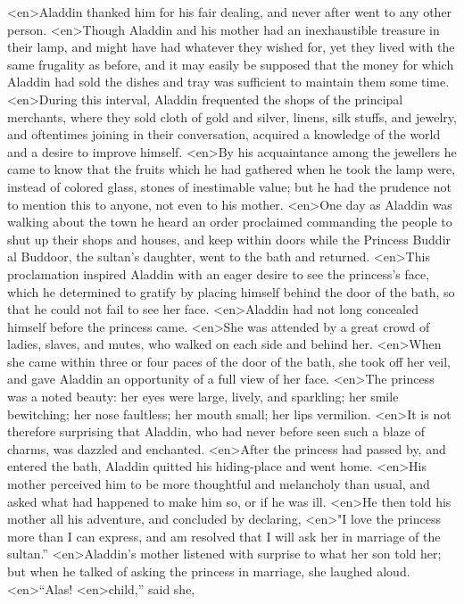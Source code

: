 <en>Aladdin thanked him for his fair dealing, and never after went to any other person.
<en>Though Aladdin and his mother had an inexhaustible treasure in their lamp, and might have had whatever they wished for, yet they lived with the same frugality as before, and it may easily be supposed that the money for which Aladdin had sold the dishes and tray was sufficient to maintain them some time.
<en>During this interval, Aladdin frequented the shops of the principal merchants, where they sold cloth of gold and silver, linens, silk stuffs, and jewelry, and oftentimes joining in their conversation, acquired a knowledge of the world and a desire to improve himself.
<en>By his acquaintance among the jewellers he came to know that the fruits which he had gathered when he took the lamp were, instead of colored glass, stones of inestimable value; but he had the prudence not to mention this to anyone, not even to his mother.
<en>One day as Aladdin was walking about the town he heard an order proclaimed commanding the people to shut up their shops and houses, and keep within doors while the Princess Buddir al Buddoor, the sultan’s daughter, went to the bath and returned.
<en>This proclamation inspired Aladdin with an eager desire to see the princess’s face, which he determined to gratify by placing himself behind the door of the bath, so that he could not fail to see her face.
<en>Aladdin had not long concealed himself before the princess came.
<en>She was attended by a great crowd of ladies, slaves, and mutes, who walked on each side and behind her.
<en>When she came within three or four paces of the door of the bath, she took off her veil, and gave Aladdin an opportunity of a full view of her face.
<en>The princess was a noted beauty: her eyes were large, lively, and sparkling; her smile bewitching; her nose faultless; her mouth small; her lips vermilion.
<en>It is not therefore surprising that Aladdin, who had never before seen such a blaze of charms, was dazzled and enchanted.
<en>After the princess had passed by, and entered the bath, Aladdin quitted his hiding-place and went home.
<en>His mother perceived him to be more thoughtful and melancholy than usual, and asked what had happened to make him so, or if he was ill.
<en>He then told his mother all his adventure, and concluded by declaring,
<en>"I love the princess more than I can express, and am resolved that I will ask her in marriage of the sultan.”
<en>Aladdin’s mother listened with surprise to what her son told her; but when he talked of asking the princess in marriage, she laughed aloud.
<en>“Alas!
<en>child,” said she,
